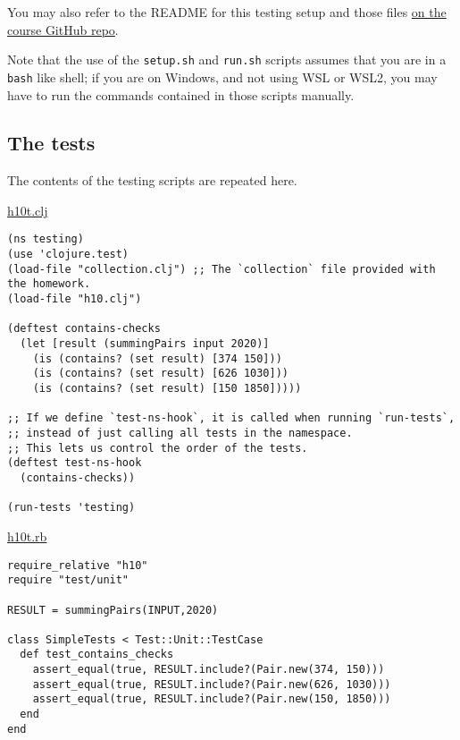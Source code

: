 \documentclass[11pt]{article}
\begin{document}
You may also refer to the README
for this testing setup and those files
\href{https://github.com/armkeh/principles-of-programming-languages/tree/master/homework/testing/h10}{on the course GitHub repo}.

Note that the use of the \texttt{setup.sh} and \texttt{run.sh} scripts assumes
that you are in a \texttt{bash} like shell; if you are on Windows,
and not using WSL or WSL2, you may have
to run the commands contained in those scripts manually.

\subsection*{The tests}
\label{sec:orgf5d2048}
The contents of the testing scripts are repeated here.

\href{./testing/h10/h10t.clj}{h10t.clj}
\begin{verbatim}
(ns testing)
(use 'clojure.test)
(load-file "collection.clj") ;; The `collection` file provided with the homework.
(load-file "h10.clj")

(deftest contains-checks
  (let [result (summingPairs input 2020)]
    (is (contains? (set result) [374 150]))
    (is (contains? (set result) [626 1030]))
    (is (contains? (set result) [150 1850]))))

;; If we define `test-ns-hook`, it is called when running `run-tests`,
;; instead of just calling all tests in the namespace.
;; This lets us control the order of the tests.
(deftest test-ns-hook
  (contains-checks))

(run-tests 'testing)
\end{verbatim}

\href{./testing/h10/h10t.rb}{h10t.rb}
\begin{verbatim}
require_relative "h10"
require "test/unit"

RESULT = summingPairs(INPUT,2020)

class SimpleTests < Test::Unit::TestCase
  def test_contains_checks
    assert_equal(true, RESULT.include?(Pair.new(374, 150)))
    assert_equal(true, RESULT.include?(Pair.new(626, 1030)))
    assert_equal(true, RESULT.include?(Pair.new(150, 1850)))
  end
end
\end{verbatim}
\end{document}
